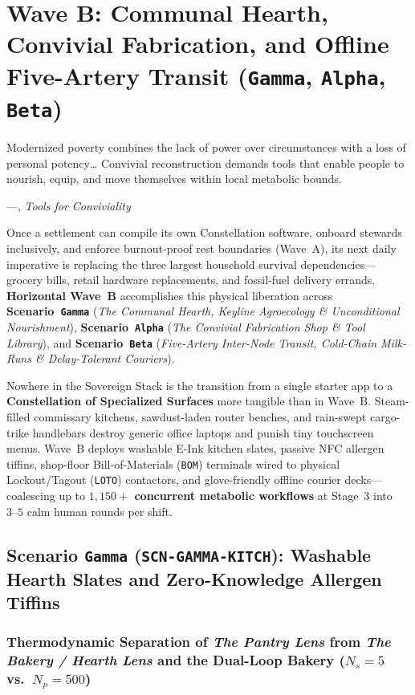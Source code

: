 \chapter{Wave B: Communal Hearth, Convivial Fabrication, and Offline Five-Artery Transit (\texttt{Gamma}, \texttt{Alpha}, \texttt{Beta})}
\label{ch:wave-b}

\epigraph{Modernized poverty combines the lack of power over circumstances with a loss of personal potency\ldots{} Convivial reconstruction demands tools that enable people to nourish, equip, and move themselves within local metabolic bounds.}{---\textcite{illich1973}, \textit{Tools for Conviviality}}

Once a settlement can compile its own Constellation software, onboard stewards inclusively, and enforce burnout-proof rest boundaries (Wave~A), its next daily imperative is replacing the three largest household survival dependencies---grocery bills, retail hardware replacements, and fossil-fuel delivery errands. \textbf{Horizontal Wave~B} accomplishes this physical liberation across \textbf{Scenario~\texttt{Gamma}} (\textit{The Communal Hearth, Keyline Agroecology \& Unconditional Nourishment}), \textbf{Scenario~\texttt{Alpha}} (\textit{The Convivial Fabrication Shop \& Tool Library}), and \textbf{Scenario~\texttt{Beta}} (\textit{Five-Artery Inter-Node Transit, Cold-Chain Milk-Runs \& Delay-Tolerant Couriers}).

Nowhere in the Sovereign Stack is the transition from a single starter app to a \textbf{Constellation of Specialized Surfaces} more tangible than in Wave~B. Steam-filled commissary kitchens, sawdust-laden router benches, and rain-swept cargo-trike handlebars destroy generic office laptops and punish tiny touchscreen menus. Wave~B deploys washable E-Ink kitchen slates, passive NFC allergen tiffins, shop-floor Bill-of-Materials (\texttt{BOM}) terminals wired to physical Lockout/Tagout (\texttt{LOTO}) contactors, and glove-friendly offline courier decks---coalescing up to \textbf{$1{,}150+$ concurrent metabolic workflows} at Stage~3 into $3\text{--}5$ calm human rounds per shift.

\section{Scenario \texttt{Gamma} (\texttt{SCN-GAMMA-KITCH}): Washable Hearth Slates and Zero-Knowledge Allergen Tiffins}
\label{sec:wave-b-gamma}

\subsection{Thermodynamic Separation of \textit{The Pantry Lens} from \textit{The Bakery / Hearth Lens} and the Dual-Loop Bakery ($N_s = 5$ vs.\ $N_p = 500$)}

